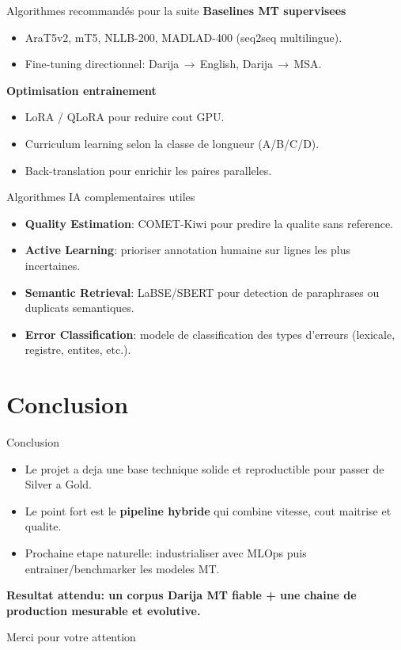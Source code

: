 \documentclass[10pt,aspectratio=169]{beamer}
\begin{document}
\begin{frame}{Algorithmes recommand\'es pour la suite}
  \textbf{Baselines MT supervisees}
  \begin{itemize}
    \item AraT5v2, mT5, NLLB-200, MADLAD-400 (seq2seq multilingue).
    \item Fine-tuning directionnel: Darija\,$\rightarrow$\,English, Darija\,$\rightarrow$\,MSA.
  \end{itemize}

  \textbf{Optimisation entrainement}
  \begin{itemize}
    \item LoRA / QLoRA pour reduire cout GPU.
    \item Curriculum learning selon la classe de longueur (A/B/C/D).
    \item Back-translation pour enrichir les paires paralleles.
  \end{itemize}
\end{frame}

\begin{frame}{Algorithmes IA complementaires utiles}
  \begin{itemize}
    \item \textbf{Quality Estimation}: COMET-Kiwi pour predire la qualite sans reference.
    \item \textbf{Active Learning}: prioriser annotation humaine sur lignes les plus incertaines.
    \item \textbf{Semantic Retrieval}: LaBSE/SBERT pour detection de paraphrases ou duplicats semantiques.
    \item \textbf{Error Classification}: modele de classification des types d'erreurs (lexicale, registre, entites, etc.).
  \end{itemize}
\end{frame}

\section{Conclusion}

\begin{frame}{Conclusion}
  \begin{itemize}
    \item Le projet a deja une base technique solide et reproductible pour passer de Silver a Gold.
    \item Le point fort est le \textbf{pipeline hybride} qui combine vitesse, cout maitrise et qualite.
    \item Prochaine etape naturelle: industrialiser avec MLOps puis entrainer/benchmarker les modeles MT.
  \end{itemize}

  \vspace{0.25cm}
  \centering
  \textbf{Resultat attendu: un corpus Darija MT fiable + une chaine de production mesurable et evolutive.}
\end{frame}

\begin{frame}
  \centering
  \Large Merci pour votre attention
\end{frame}
\end{document}
